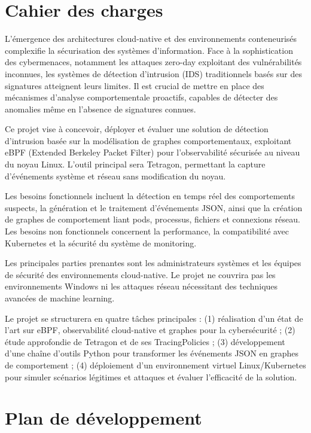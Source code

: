 \documentclass[a4paper,12pt]{article}
\begin{document}
\newpage

\section{Cahier des charges}

L’émergence des architectures cloud-native et des environnements conteneurisés complexifie la sécurisation des systèmes d’information. Face à la sophistication des cybermenaces, notamment les attaques zero-day exploitant des vulnérabilités inconnues, les systèmes de détection d’intrusion (IDS) traditionnels basés sur des signatures atteignent leurs limites. Il est crucial de mettre en place des mécanismes d’analyse comportementale proactifs, capables de détecter des anomalies même en l’absence de signatures connues.

Ce projet vise à concevoir, déployer et évaluer une solution de détection d’intrusion basée sur la modélisation de graphes comportementaux, exploitant eBPF (Extended Berkeley Packet Filter) pour l’observabilité sécurisée au niveau du noyau Linux. L’outil principal sera Tetragon, permettant la capture d’événements système et réseau sans modification du noyau.

Les besoins fonctionnels incluent la détection en temps réel des comportements suspects, la génération et le traitement d’événements JSON, ainsi que la création de graphes de comportement liant pods, processus, fichiers et connexions réseau. Les besoins non fonctionnels concernent la performance, la compatibilité avec Kubernetes et la sécurité du système de monitoring.

Les principales parties prenantes sont les administrateurs systèmes et les équipes de sécurité des environnements cloud-native. Le projet ne couvrira pas les environnements Windows ni les attaques réseau nécessitant des techniques avancées de machine learning.

Le projet se structurera en quatre tâches principales : (1) réalisation d’un état de l’art sur eBPF, observabilité cloud-native et graphes pour la cybersécurité ; (2) étude approfondie de Tetragon et de ses TracingPolicies ; (3) développement d’une chaîne d’outils Python pour transformer les événements JSON en graphes de comportement ; (4) déploiement d’un environnement virtuel Linux/Kubernetes pour simuler scénarios légitimes et attaques et évaluer l’efficacité de la solution.

\section{Plan de développement}
\end{document}
